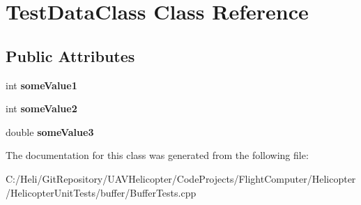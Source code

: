 \hypertarget{class_test_data_class}{\section{Test\-Data\-Class Class Reference}
\label{class_test_data_class}
}
\subsection*{Public Attributes}
\begin{DoxyCompactItemize}
\item 
\hypertarget{class_test_data_class_a7c4978c3c6f1798cdcbe182b96ede620}{int {\bfseries some\-Value1}}\label{class_test_data_class_a7c4978c3c6f1798cdcbe182b96ede620}

\item 
\hypertarget{class_test_data_class_a489088942e504faa8c916f48791ffb43}{int {\bfseries some\-Value2}}\label{class_test_data_class_a489088942e504faa8c916f48791ffb43}

\item 
\hypertarget{class_test_data_class_a3956252b384225dfee8c2ad82065b864}{double {\bfseries some\-Value3}}\label{class_test_data_class_a3956252b384225dfee8c2ad82065b864}

\end{DoxyCompactItemize}


The documentation for this class was generated from the following file\-:\begin{DoxyCompactItemize}
\item 
C\-:/\-Heli/\-Git\-Repository/\-U\-A\-V\-Helicopter/\-Code\-Projects/\-Flight\-Computer/\-Helicopter/\-Helicopter\-Unit\-Tests/buffer/Buffer\-Tests.\-cpp\end{DoxyCompactItemize}
